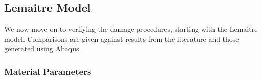\documentclass[sn-mathphys,Numbered]{sn-jnl}%
\begin{document}



%		
%		
%		




\subsection{Lemaitre Model}
We now move on to verifying the damage procedures, starting with the Lemaitre model.
Comparisons are given against results from the literature and those generated using Abaqus.


\subsubsection{Material Parameters}
\end{document}
